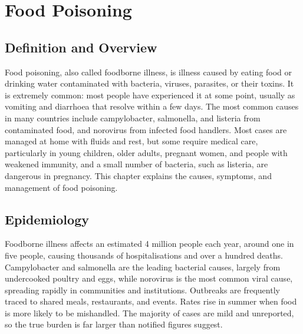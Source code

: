 \chapter{Food Poisoning}

\section*{Definition and Overview}
Food poisoning, also called foodborne illness, is illness caused by eating food or drinking water contaminated with bacteria, viruses, parasites, or their toxins. It is extremely common: most people have experienced it at some point, usually as vomiting and diarrhoea that resolve within a few days. The most common causes in many countries include campylobacter, salmonella, and listeria from contaminated food, and norovirus from infected food handlers. Most cases are managed at home with fluids and rest, but some require medical care, particularly in young children, older adults, pregnant women, and people with weakened immunity, and a small number of bacteria, such as listeria, are dangerous in pregnancy. This chapter explains the causes, symptoms, and management of food poisoning.

\section*{Epidemiology}
Foodborne illness affects an estimated 4 million people each year, around one in five people, causing thousands of hospitalisations and over a hundred deaths. Campylobacter and salmonella are the leading bacterial causes, largely from undercooked poultry and eggs, while norovirus is the most common viral cause, spreading rapidly in communities and institutions. Outbreaks are frequently traced to shared meals, restaurants, and events. Rates rise in summer when food is more likely to be mishandled. The majority of cases are mild and unreported, so the true burden is far larger than notified figures suggest.

